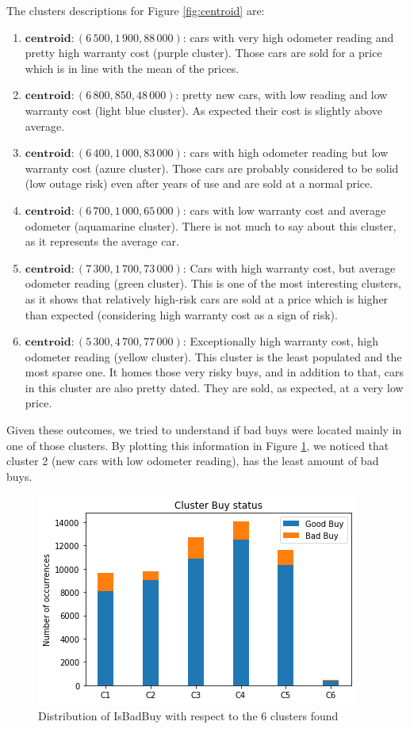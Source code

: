\documentclass{article}
\begin{document}
	
	The clusters descriptions for Figure \ref{fig:centroid} are:
	\begin{enumerate}
		\item $\mathbf{centroid}: (6\,500,  1\,900,  88\,000)$: cars with very high odometer reading and pretty high warranty cost (purple cluster). Those cars are sold for a price which is in line with the mean of the prices.
		\item $\mathbf{centroid}: (6\,800,  850,  48\,000)$: pretty new cars, with low reading and low warranty cost (light blue cluster). As expected their cost is slightly above average.
		\item $\mathbf{centroid}: (6\,400,  1\,000,  83\,000)$: cars with high odometer reading but low warranty cost (azure cluster). Those cars are probably considered to be solid (low outage risk) even after years of use and are sold at a normal price.
		\item $\mathbf{centroid}: (6\,700,  1\,000,  65\,000)$: cars with low warranty cost and average odometer (aquamarine cluster). There is not much to say about this cluster, as it represents the average car.
		\item $\mathbf{centroid}: (7\,300,  1\,700,  73\,000)$: Cars with high warranty cost, but average odometer reading (green cluster). This is one of the most interesting clusters, as it shows that relatively high-risk cars are sold at a price which is higher than expected (considering high warranty cost as a sign of risk).
		\item $\mathbf{centroid}: (5\,300,  4\,700,  77\,000)$: Exceptionally high warranty cost, high odometer reading (yellow cluster). This cluster is the least populated and the most sparse one. It homes those very risky buys, and in addition to that, cars in this cluster are also pretty dated. They are sold, as expected, at a very low price. 
	\end{enumerate}
	Given these outcomes, we tried to understand if bad buys were located mainly in one of those clusters. By plotting this information in Figure \ref{fig:clusterbuy}, we noticed that cluster 2 (new cars with low odometer reading), has the least amount of bad buys.
	\begin{figure}[H]
		\centering
		\includegraphics[width=.4\textwidth, keepaspectratio]{clusterbuy}
		\caption{{Distribution of IsBadBuy with respect to the 6 clusters found}}
		\label{fig:clusterbuy}
	\end{figure}
	
\end{document}
